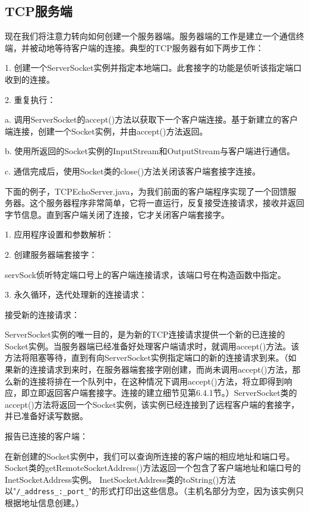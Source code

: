 	\subsection{TCP服务端}

		现在我们将注意力转向如何创建一个服务器端。服务器端的工作是建立一个通信终端，并被动地等待客户端的连接。典型的TCP服务器有如下两步工作：

		1. 创建一个ServerSocket实例并指定本地端口。此套接字的功能是侦听该指定端口收到的连接。

		2. 重复执行：

		a. 调用ServerSocket的accept()方法以获取下一个客户端连接。基于新建立的客户端连接，创建一个Socket实例，并由accept()方法返回。

		b. 使用所返回的Socket实例的InputStream和OutputStream与客户端进行通信。

		c. 通信完成后，使用Socket类的close()方法关闭该客户端套接字连接。

		下面的例子，TCPEchoServer.java，为我们前面的客户端程序实现了一个回馈服务器。这个服务器程序非常简单，它将一直运行，反复接受连接请求，接收并返回字节信息。直到客户端关闭了连接，它才关闭客户端套接字。

		

		1. 应用程序设置和参数解析：

		2. 创建服务器端套接字：

		servSock侦听特定端口号上的客户端连接请求，该端口号在构造函数中指定。

		3. 永久循环，迭代处理新的连接请求：

		接受新的连接请求：

		ServerSocket实例的唯一目的，是为新的TCP连接请求提供一个新的已连接的Socket实例。当服务器端已经准备好处理客户端请求时，就调用accept()方法。该方法将阻塞等待，直到有向ServerSocket实例指定端口的新的连接请求到来。（如果新的连接请求到来时，在服务器端套接字刚创建，而尚未调用accept()方法，那么新的连接将排在一个队列中，在这种情况下调用accept()方法，将立即得到响应，即立即返回客户端套接字。连接的建立细节见第6.4.1节。）ServerSocket类的accept()方法将返回一个Socket实例，该实例已经连接到了远程客户端的套接字，并已准备好读写数据。

		报告已连接的客户端：

		在新创建的Socket实例中，我们可以查询所连接的客户端的相应地址和端口号。Socket类的getRemoteSocketAddress()方法返回一个包含了客户端地址和端口号的InetSocketAddress实例。 InetSocketAddress类的toString()方法以"\verb|/_address_:_port_|"的形式打印出这些信息。（主机名部分为空，因为该实例只根据地址信息创建。）

